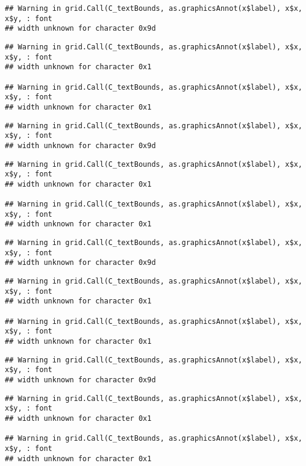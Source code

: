\documentclass[
]{article}
\begin{document}
\begin{verbatim}
## Warning in grid.Call(C_textBounds, as.graphicsAnnot(x$label), x$x, x$y, : font
## width unknown for character 0x9d
\end{verbatim}

\begin{verbatim}
## Warning in grid.Call(C_textBounds, as.graphicsAnnot(x$label), x$x, x$y, : font
## width unknown for character 0x1

## Warning in grid.Call(C_textBounds, as.graphicsAnnot(x$label), x$x, x$y, : font
## width unknown for character 0x1
\end{verbatim}

\begin{verbatim}
## Warning in grid.Call(C_textBounds, as.graphicsAnnot(x$label), x$x, x$y, : font
## width unknown for character 0x9d
\end{verbatim}

\begin{verbatim}
## Warning in grid.Call(C_textBounds, as.graphicsAnnot(x$label), x$x, x$y, : font
## width unknown for character 0x1

## Warning in grid.Call(C_textBounds, as.graphicsAnnot(x$label), x$x, x$y, : font
## width unknown for character 0x1
\end{verbatim}

\begin{verbatim}
## Warning in grid.Call(C_textBounds, as.graphicsAnnot(x$label), x$x, x$y, : font
## width unknown for character 0x9d
\end{verbatim}

\begin{verbatim}
## Warning in grid.Call(C_textBounds, as.graphicsAnnot(x$label), x$x, x$y, : font
## width unknown for character 0x1

## Warning in grid.Call(C_textBounds, as.graphicsAnnot(x$label), x$x, x$y, : font
## width unknown for character 0x1
\end{verbatim}

\begin{verbatim}
## Warning in grid.Call(C_textBounds, as.graphicsAnnot(x$label), x$x, x$y, : font
## width unknown for character 0x9d
\end{verbatim}

\begin{verbatim}
## Warning in grid.Call(C_textBounds, as.graphicsAnnot(x$label), x$x, x$y, : font
## width unknown for character 0x1

## Warning in grid.Call(C_textBounds, as.graphicsAnnot(x$label), x$x, x$y, : font
## width unknown for character 0x1
\end{verbatim}
\end{document}

